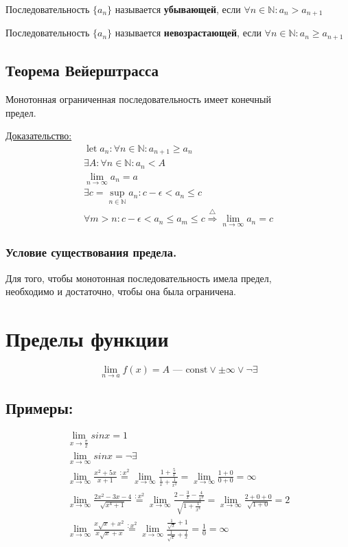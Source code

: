 \documentclass{article}
\DeclareMathOperator*{\Let}{let}
\begin{document}
Последовательность $\{ a_n \}$ называется \textbf{убывающей}, если $\forall n \in \mathbb{N} : a_n > a_{n + 1}$

Последовательность $\{ a_n \}$ называется \textbf{невозрастающей}, если $\forall n \in \mathbb{N} : a_n \ge a_{n + 1}$

\subsection{Теорема Вейерштрасса}

Монотонная ограниченная последовательность имеет конечный \\
предел.

\underline{Доказательство:}
\begin{gather*}
	\Let a_n : \forall n \in \mathbb{N} : a_{n + 1} \ge a_n \\
	\exists A : \forall n \in \mathbb{N} : a_n < A \\
	\lim_{n \to \infty} a_n = a \\
	\exists c = \sup_{n \in \mathbb{N}} a_n : c - \epsilon < a_n \le c \\
	\forall m > n : c - \epsilon < a_n \le a_m \le c 
	\stackrel{\triangle}{\Rightarrow} \lim_{n \to \infty} a_n = c
\end{gather*}

\subsubsection{Условие существования предела.}

Для того, чтобы монотонная последовательность имела предел, \\
необходимо и достаточно, чтобы она была ограничена.

\section{Пределы функции}

\[
\lim_{n \to a} f(x) = A \text{ --- const} \lor \pm \infty \lor \lnot \exists
\]

\subsection*{Примеры:}
\begin{gather*}
	\lim_{x \to \frac{\pi}{2}} sin x = 1 \\
	\lim_{x \to \infty} sin x = \lnot \exists \\
	\lim_{x \to \infty} \frac{x^2 + 5x}{x + 1} \stackrel{: x^2}{=}
	\lim_{x \to \infty} \frac{1 + \frac{5}{x}}{\frac{1}{x} + \frac{1}{x^2}} =
	\lim_{x \to \infty} \frac{1 + 0}{0 + 0} = \infty \\
	\lim_{x \to \infty} \frac{2x^2 - 3x - 4}{\sqrt{x^4 + 1}} \stackrel{: x^2}{=}
	\lim_{x \to \infty} \frac{2 - \frac{3}{x} - \frac{4}{x^2}}{\sqrt{1 + \frac{1}{x^4}}} =
	\lim_{x \to \infty} \frac{2 + 0 + 0}{\sqrt{1 + 0}} = 2 \\
	\lim_{x \to \infty} \frac{x\sqrt{x} + x^2}{x\sqrt{x} + x} \stackrel{: x^2}{=}
	\lim_{x \to \infty} \frac{\frac{1}{\sqrt{x}} + 1}{\frac{1}{\sqrt{x}} + \frac{1}{x}} =
	\frac{1}{0} = \infty
\end{gather*}
\end{document}
